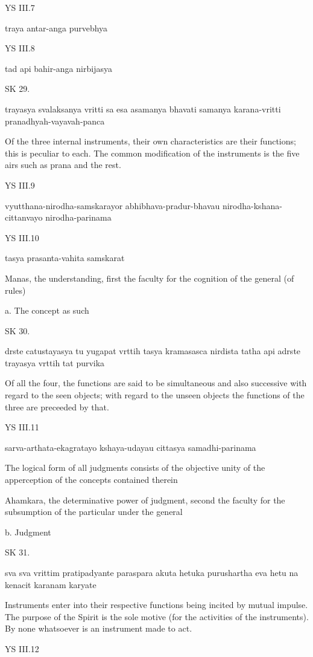 YS III.7

traya antar-anga purvebhya

YS III.8

tad api bahir-anga nirbijasya

SK 29.

trayasya svalaksanya vritti sa esa asamanya bhavati
samanya karana-vritti pranadhyah-vayavah-panca

Of the three internal instruments,
their own characteristics are their functions;
this is peculiar to each.
The common modification of the instruments is the five airs
such as prana and the rest.

YS III.9

vyutthana-nirodha-samskarayor abhibhava-pradur-bhavau
nirodha-kshana-cittanvayo nirodha-parinama

YS III.10

tasya prasanta-vahita samskarat

Manas, the understanding, first the faculty for
the cognition of the general (of rules)

a. The concept as such

SK 30.

drste catustayasya tu yugapat vrttih tasya kramasasca nirdista
tatha api adrste trayasya vrttih tat purvika

Of all the four, the functions are said to be simultaneous and also successive
with regard to the seen objects;
with regard to the unseen objects
the functions of the three are preceeded by that.

YS III.11

sarva-arthata-ekagratayo kshaya-udayau cittasya samadhi-parinama

The logical form of all judgments consists of
the objective unity of the apperception of the concepts contained therein

Ahamkara, the determinative power of judgment,
second the faculty for the subsumption of the particular under the general

b. Judgment

SK 31.

sva sva vrittim pratipadyante paraspara akuta hetuka
purushartha eva hetu na kenacit karanam karyate

Instruments enter into their respective functions
being incited by mutual impulse.
The purpose of the Spirit is the sole motive
(for the activities of the instruments).
By none whatsoever is an instrument made to act.

YS III.12

